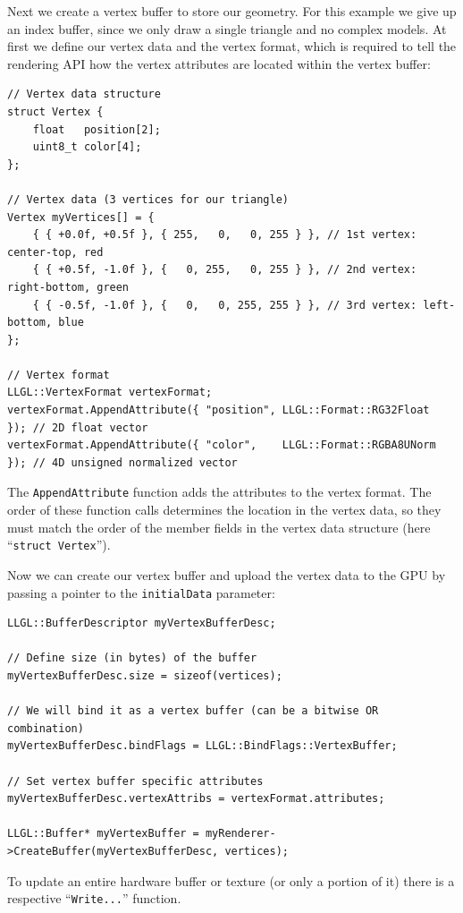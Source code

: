 \documentclass{article}
\begin{document}
Next we create a vertex buffer to store our geometry. For this example we give up an index buffer,
since we only draw a single triangle and no complex models. At first we define our vertex data and the vertex format,
which is required to tell the rendering API how the vertex attributes are located within the vertex buffer:
\begin{lstlisting}
// Vertex data structure
struct Vertex {
    float   position[2];
    uint8_t color[4];
};

// Vertex data (3 vertices for our triangle)
Vertex myVertices[] = {
    { { +0.0f, +0.5f }, { 255,   0,   0, 255 } }, // 1st vertex: center-top, red
    { { +0.5f, -1.0f }, {   0, 255,   0, 255 } }, // 2nd vertex: right-bottom, green
    { { -0.5f, -1.0f }, {   0,   0, 255, 255 } }, // 3rd vertex: left-bottom, blue
};

// Vertex format
LLGL::VertexFormat vertexFormat;
vertexFormat.AppendAttribute({ "position", LLGL::Format::RG32Float  }); // 2D float vector
vertexFormat.AppendAttribute({ "color",    LLGL::Format::RGBA8UNorm }); // 4D unsigned normalized vector
\end{lstlisting}
The \texttt{AppendAttribute} function adds the attributes to the vertex format.
The order of these function calls determines the location in the vertex data, so they must match
the order of the member fields in the vertex data structure (here ``\texttt{struct Vertex}'').

Now we can create our vertex buffer and upload the vertex data to the GPU by passing a pointer
to the \texttt{initialData} parameter:
\begin{lstlisting}
LLGL::BufferDescriptor myVertexBufferDesc;

// Define size (in bytes) of the buffer
myVertexBufferDesc.size = sizeof(vertices);

// We will bind it as a vertex buffer (can be a bitwise OR combination)
myVertexBufferDesc.bindFlags = LLGL::BindFlags::VertexBuffer;

// Set vertex buffer specific attributes
myVertexBufferDesc.vertexAttribs = vertexFormat.attributes;

LLGL::Buffer* myVertexBuffer = myRenderer->CreateBuffer(myVertexBufferDesc, vertices);
\end{lstlisting}
To update an entire hardware buffer or texture (or only a portion of it) there is a respective
``\texttt{Write...}'' function.
\end{document}
